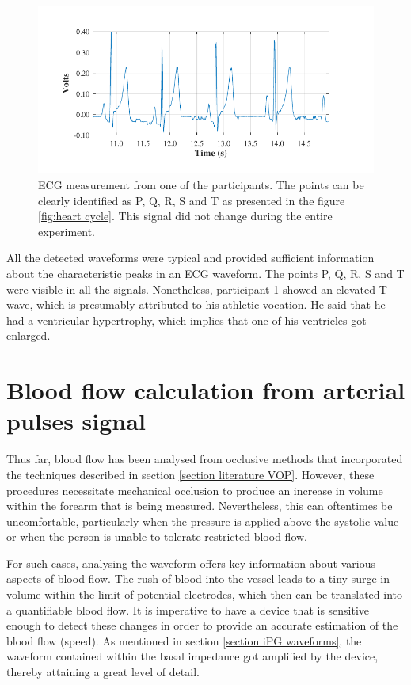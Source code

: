 \begin{figure}[!htbp]
	\centering
	\includegraphics{figure19}    
	\caption[ECG measurement acquired by the system]{ECG measurement from one of the participants. The points can be clearly identified as P, Q, R, S and T as presented in the figure \ref{fig:heart cycle}. This signal did not change during the entire experiment.}
	\label{fig:ECG}
\end{figure} 

All the detected waveforms were typical and provided sufficient information about the characteristic peaks in an ECG waveform. The points P, Q, R, S and T were visible in all the signals. Nonetheless, participant 1 showed an elevated T-wave, which is presumably attributed to his athletic vocation. He said that he had a ventricular hypertrophy, which implies that one of his ventricles got enlarged.  

\section{Blood flow calculation from arterial pulses signal}
\label{section apa flow arterial pulses}
Thus far, blood flow has been analysed from occlusive methods that incorporated the techniques described in section \ref{section literature VOP}. However, these procedures necessitate mechanical occlusion to produce an increase in volume within the forearm that is being measured. Nevertheless, this can oftentimes be uncomfortable, particularly when the pressure is applied above the systolic value or when the person is unable to tolerate restricted blood flow.

For such cases, analysing the waveform offers key information about various aspects of blood flow. The rush of blood into the vessel leads to a tiny surge in volume within the limit of potential electrodes, which then can be translated into a quantifiable blood flow. It is imperative to have a device that is sensitive enough to detect these changes in order to provide an accurate estimation of the blood flow (speed). As mentioned in section \ref{section iPG waveforms}, the waveform contained within the basal impedance got amplified by the device, thereby attaining a great level of detail.

